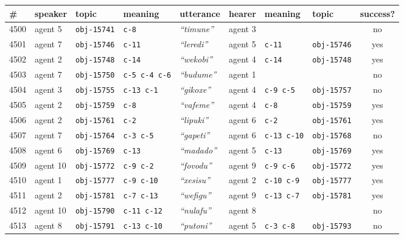 
\renewcommand{\arraystretch}{1.3}{

\begin{tabular}{@{}llllllllc@{}}
  \# & speaker & topic & meaning & utterance & hearer & meaning & topic & success? \\
  \hline
4500 & agent 5 & \texttt{obj-15741} & \texttt{c-8} & \textit{``timune''} & agent 3 & \texttt{} &  & no \\
4501 & agent 7 & \texttt{obj-15746} & \texttt{c-11} & \textit{``leredi''} & agent 5 & \texttt{c-11} & \texttt{obj-15746} & yes \\
4502 & agent 2 & \texttt{obj-15748} & \texttt{c-14} & \textit{``wekobi''} & agent 4 & \texttt{c-14} & \texttt{obj-15748} & yes \\
4503 & agent 7 & \texttt{obj-15750} & \texttt{c-5 c-4 c-6} & \textit{``budume''} & agent 1 & \texttt{} &  & no \\
4504 & agent 3 & \texttt{obj-15755} & \texttt{c-13 c-1} & \textit{``gikoxe''} & agent 4 & \texttt{c-9 c-5} & \texttt{obj-15757} & no \\
4505 & agent 2 & \texttt{obj-15759} & \texttt{c-8} & \textit{``vafeme''} & agent 4 & \texttt{c-8} & \texttt{obj-15759} & yes \\
4506 & agent 2 & \texttt{obj-15761} & \texttt{c-2} & \textit{``lipuki''} & agent 6 & \texttt{c-2} & \texttt{obj-15761} & yes \\
4507 & agent 7 & \texttt{obj-15764} & \texttt{c-3 c-5} & \textit{``gapeti''} & agent 6 & \texttt{c-13 c-10} & \texttt{obj-15768} & no \\
4508 & agent 6 & \texttt{obj-15769} & \texttt{c-13} & \textit{``madado''} & agent 5 & \texttt{c-13} & \texttt{obj-15769} & yes \\
4509 & agent 10 & \texttt{obj-15772} & \texttt{c-9 c-2} & \textit{``fovodu''} & agent 9 & \texttt{c-9 c-6} & \texttt{obj-15772} & yes \\
4510 & agent 1 & \texttt{obj-15777} & \texttt{c-9 c-10} & \textit{``xesisu''} & agent 2 & \texttt{c-10 c-9} & \texttt{obj-15777} & yes \\
4511 & agent 2 & \texttt{obj-15781} & \texttt{c-7 c-13} & \textit{``wefigu''} & agent 9 & \texttt{c-13 c-7} & \texttt{obj-15781} & yes \\
4512 & agent 10 & \texttt{obj-15790} & \texttt{c-11 c-12} & \textit{``nulafu''} & agent 8 & \texttt{} &  & no \\
4513 & agent 8 & \texttt{obj-15791} & \texttt{c-13 c-10} & \textit{``putoni''} & agent 5 & \texttt{c-3 c-8} & \texttt{obj-15793} & no \\

\end{tabular}}
